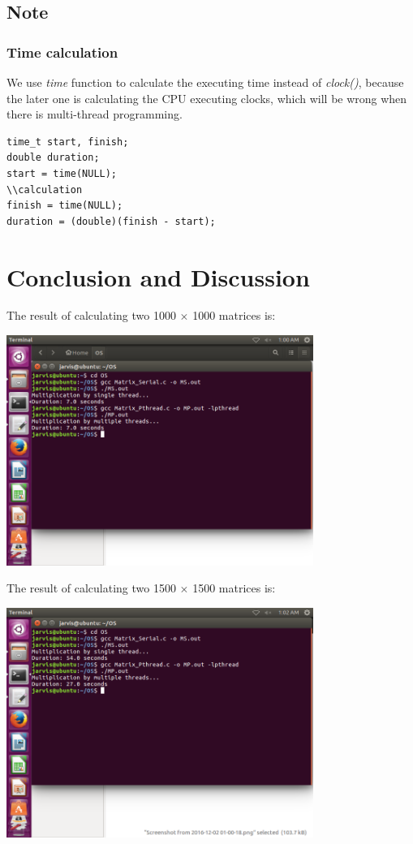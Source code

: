 \documentclass[a4paper, 11pt]{article}
\begin{document}
\subsection{Note}
\subsubsection{Time calculation}
We use \emph{time{}} function to calculate the executing time instead of \emph{clock()}, because the later one is calculating the CPU executing clocks, which will be wrong when there is multi-thread programming.
\begin{lstlisting}
time_t start, finish;
double duration;
start = time(NULL);
\\calculation
finish = time(NULL);
duration = (double)(finish - start);
\end{lstlisting}
\section{Conclusion and Discussion}
The result of calculating two 1000 $\times$ 1000 matrices is:

\includegraphics[width=10cm]{pic/1000.png}

The result of calculating two 1500 $\times$ 1500 matrices is:

\includegraphics[width=10cm]{pic/1500.png}
\end{document}
